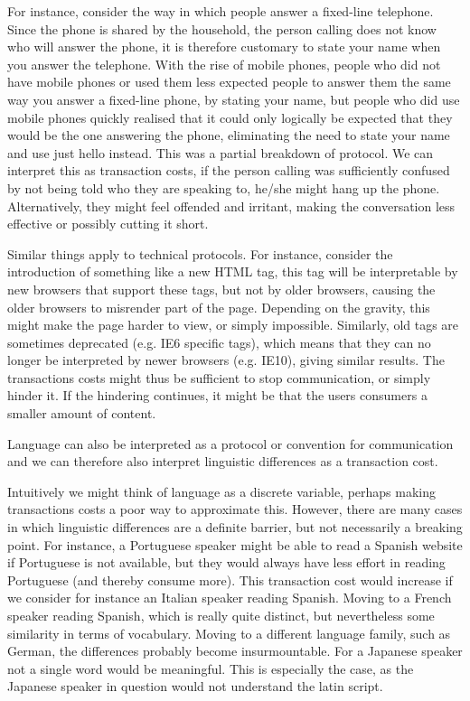 \documentclass[a4paper,british]{article}\usepackage[]{graphicx}\usepackage[]{color}
\begin{document}
For instance, consider the way in which people answer a fixed-line
telephone. Since the phone is shared by the household, the person
calling does not know who will answer the phone, it is therefore customary
to state your name when you answer the telephone. With the rise of
mobile phones, people who did not have mobile phones or used them
less expected people to answer them the same way you answer a fixed-line
phone, by stating your name, but people who did use mobile phones
quickly realised that it could only logically be expected that they
would be the one answering the phone, eliminating the need to state
your name and use just \textquotedbl{}hello\textquotedbl{} instead.
This was a partial breakdown of protocol. We can interpret this as
transaction costs, if the person calling was sufficiently confused
by not being told who they are speaking to, he/she might hang up the
phone. Alternatively, they might feel offended and irritant, making
the conversation less effective or possibly cutting it short.

Similar things apply to technical protocols. For instance, consider
the introduction of something like a new HTML tag, this tag will be
interpretable by new browsers that support these tags, but not by
older browsers, causing the older browsers to misrender part of the
page. Depending on the gravity, this might make the page harder to
view, or simply impossible. Similarly, old tags are sometimes deprecated
(e.g. IE6 specific tags), which means that they can no longer be interpreted
by newer browsers (e.g. IE10), giving similar results. The transactions
costs might thus be sufficient to stop communication, or simply hinder
it. If the hindering continues, it might be that the users consumers
a smaller amount of content.

Language can also be interpreted as a protocol or convention for communication
and we can therefore also interpret linguistic differences as a transaction
cost.

Intuitively we might think of language as a discrete variable, perhaps
making transactions costs a poor way to approximate this. However,
there are many cases in which linguistic differences are a definite
barrier, but not necessarily a breaking point. For instance, a Portuguese
speaker might be able to read a Spanish website if Portuguese is not
available, but they would always have less effort in reading Portuguese
(and thereby consume more). This transaction cost would increase if
we consider for instance an Italian speaker reading Spanish. Moving
to a French speaker reading Spanish, which is really quite distinct,
but nevertheless some similarity in terms of vocabulary. Moving to
a different language family, such as German, the differences probably
become insurmountable. For a Japanese speaker not a single word would
be meaningful. This is especially the case, as the Japanese speaker
in question would not understand the latin script. 
\end{document}
